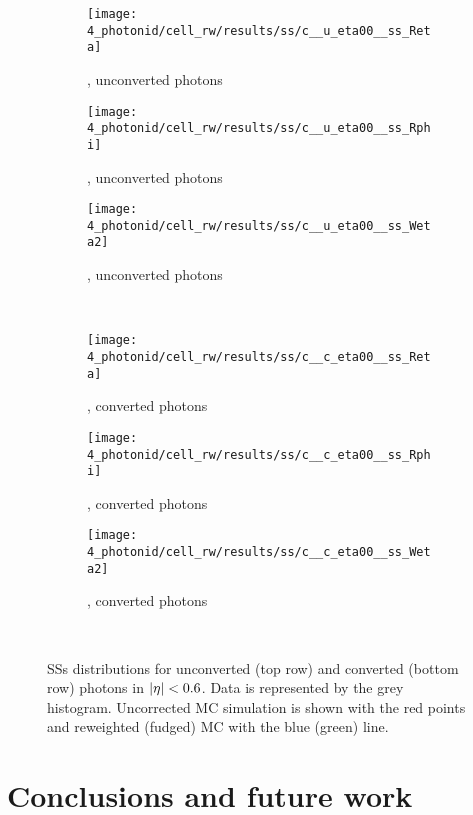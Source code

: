 \begin{figure}[ht!]
    \centering
    \begin{subfigure}[h]{0.32\linewidth}
        \centering
        \texttt{[image: 4\_photonid/cell\_rw/results/ss/c\_\_u\_eta00\_\_ss\_Reta]}
        \caption{\reta, unconverted photons}
    \end{subfigure}
    \hfill
    \begin{subfigure}[h]{0.32\linewidth}
        \centering
        \texttt{[image: 4\_photonid/cell\_rw/results/ss/c\_\_u\_eta00\_\_ss\_Rphi]}
        \caption{\rphi, unconverted photons}
    \end{subfigure}
    \begin{subfigure}[h]{0.32\linewidth}
        \centering
        \texttt{[image: 4\_photonid/cell\_rw/results/ss/c\_\_u\_eta00\_\_ss\_Weta2]}
        \caption{\weta, unconverted photons}
    \end{subfigure}\\
    \begin{subfigure}[h]{0.32\linewidth}
        \centering
        \texttt{[image: 4\_photonid/cell\_rw/results/ss/c\_\_c\_eta00\_\_ss\_Reta]}
        \caption{\reta, converted photons}
    \end{subfigure}
    \hfill
    \begin{subfigure}[h]{0.32\linewidth}
        \centering
        \texttt{[image: 4\_photonid/cell\_rw/results/ss/c\_\_c\_eta00\_\_ss\_Rphi]}
        \caption{\rphi, converted photons}
    \end{subfigure}
    \begin{subfigure}[h]{0.32\linewidth}
        \centering
        \texttt{[image: 4\_photonid/cell\_rw/results/ss/c\_\_c\_eta00\_\_ss\_Weta2]}
        \caption{\weta, converted photons}
    \end{subfigure}\\
    \caption{\acp{SS} distributions for unconverted (top row) and converted (bottom row) photons in \(|\eta|<0.6\). Data is represented by the grey histogram. Uncorrected \ac{MC} simulation is shown with the red points and reweighted (fudged) \ac{MC} with the blue (green) line.}
    \label{fig:ss_corrections:cell_rw:results:ss}
\end{figure}






\section{Conclusions and future work}
\label{sec:ss_corrections:summary}

